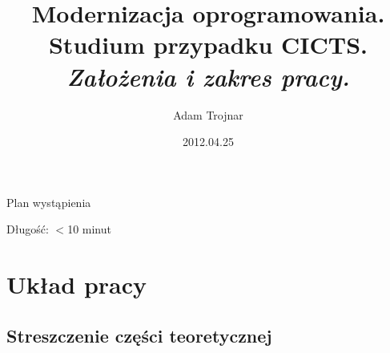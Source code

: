 \usepackage{pgfpages}
\usepackage{graphicx}
\usepackage{ucs}
\usepackage[utf8x]{inputenc}
\usepackage{tabularx}

\usepackage{polski}

{
}

\title[Modernizacja oprogramowania CICTS]{Modernizacja oprogramowania. \\ Studium przypadku CICTS.\\\textsl{\small Założenia i zakres pracy.}}
\author[A. Trojnar]{Adam Trojnar}
\date{2012.04.25}




\begin{frame}
  \titlepage
\end{frame}

\begin{frame}{Plan wystąpienia}
	\tableofcontents

	Długość: $<$10 minut
\end{frame}

\section{Układ pracy}

\subsection{Streszczenie części teoretycznej}

